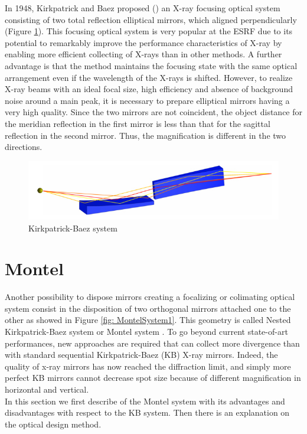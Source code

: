 \hspace{10mm} In 1948, Kirkpatrick and Baez proposed (\cite{kirkpatrick1948formation}) an X-ray focusing optical system consisting of two total reflection elliptical mirrors, which aligned perpendicularly (Figure \ref{fig: KirckPatrick Baez System}). This focusing optical system is very popular at the ESRF due to its potential to remarkably improve the performance characteristics of X-ray by enabling more efficient collecting of X-rays than in other methods. A further advantage is that the method maintains the focusing state with the same optical arrangement even if the wavelength of the X-rays is shifted. However, to realize X-ray beams with an ideal focal size, high efficiency and absence of background noise around a main peak, it is necessary to prepare elliptical mirrors having a very high quality. Since the two mirrors are not coincident, the object distance for the meridian reflection in the first mirror is less than that for the sagittal reflection in the second mirror. Thus, the magnification is different in the two directions.
\begin{figure}[H]
%
\centering
%
\includegraphics[width=.6\textwidth]{Immagini/Chapter2/KBSystem}
%
\caption{Kirkpatrick-Baez system}
%
\label{fig: KirckPatrick Baez System}
%
\end{figure}


\section{Montel}
Another possibility to dispose mirrors creating a focalizing or colimating optical system consist in the disposition of two orthogonal mirrors attached one to the other as showed in Figure \ref{fig: MontelSystem1}. This geometry is called Nested Kirkpatrick-Baez system or Montel system \cite{montel1957x}. To go beyond current state-of-art performances, new approaches are required that can collect more divergence than with standard sequential Kirkpatrick-Baez (KB) X-ray mirrors. Indeed, the quality of x-ray mirrors has now reached the diffraction limit, and simply more perfect KB mirrors cannot decrease spot size because of different magnification in horizontal and vertical.
\\
In this section we first describe of the Montel system with its advantages and disadvantages with respect to the KB system. Then there is an explanation on the optical design method.

